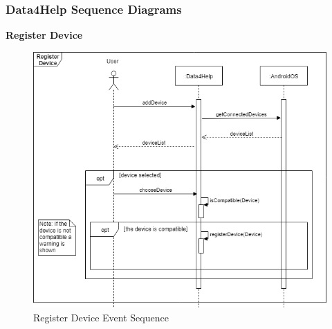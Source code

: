 \newpage
{\color{Blue}\subsubsection{Data4Help Sequence Diagrams}}
\setlength{\parskip}{0.1cm}
\textbf{Register Device}
\begin{figure}[H]
	\includegraphics[scale=0.55]{Images/UML/RegisterDeviceSeq.png}
	\captionsetup{justification=raggedright, singlelinecheck=false}
	\vspace*{-2mm}\caption{Register Device Event Sequence}
	\label{figure13}
\end{figure}

